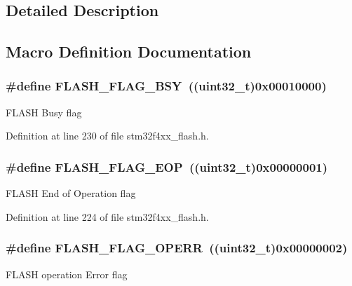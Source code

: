 \subsection{Detailed Description}


\subsection{Macro Definition Documentation}
\hypertarget{group___f_l_a_s_h___flags_gad3bc368f954ad7744deda3315da2fff7}{
\subsubsection[{F\-L\-A\-S\-H\-\_\-\-F\-L\-A\-G\-\_\-\-B\-S\-Y}]{\setlength{\rightskip}{0pt plus 5cm}\#define F\-L\-A\-S\-H\-\_\-\-F\-L\-A\-G\-\_\-\-B\-S\-Y~((uint32\-\_\-t)0x00010000)}}\label{group___f_l_a_s_h___flags_gad3bc368f954ad7744deda3315da2fff7}
F\-L\-A\-S\-H Busy flag 

Definition at line 230 of file stm32f4xx\-\_\-flash.\-h.

\hypertarget{group___f_l_a_s_h___flags_gaf043ba4d8f837350bfc7754a99fae5a9}{
\subsubsection[{F\-L\-A\-S\-H\-\_\-\-F\-L\-A\-G\-\_\-\-E\-O\-P}]{\setlength{\rightskip}{0pt plus 5cm}\#define F\-L\-A\-S\-H\-\_\-\-F\-L\-A\-G\-\_\-\-E\-O\-P~((uint32\-\_\-t)0x00000001)}}\label{group___f_l_a_s_h___flags_gaf043ba4d8f837350bfc7754a99fae5a9}
F\-L\-A\-S\-H End of Operation flag 

Definition at line 224 of file stm32f4xx\-\_\-flash.\-h.

\hypertarget{group___f_l_a_s_h___flags_gad8a96ceda91fcf0d1299da933b5816f1}{
\subsubsection[{F\-L\-A\-S\-H\-\_\-\-F\-L\-A\-G\-\_\-\-O\-P\-E\-R\-R}]{\setlength{\rightskip}{0pt plus 5cm}\#define F\-L\-A\-S\-H\-\_\-\-F\-L\-A\-G\-\_\-\-O\-P\-E\-R\-R~((uint32\-\_\-t)0x00000002)}}\label{group___f_l_a_s_h___flags_gad8a96ceda91fcf0d1299da933b5816f1}
F\-L\-A\-S\-H operation Error flag 

